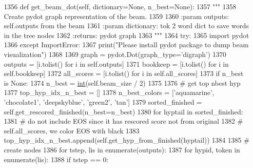 \begin{DoxyCode}
1356     \textcolor{keyword}{def }get\_beam\_dot(self, dictionary=None, n\_best=None):
1357         \textcolor{stringliteral}{"""}
1358 \textcolor{stringliteral}{        Create pydot graph representation of the beam.}
1359 \textcolor{stringliteral}{}
1360 \textcolor{stringliteral}{        :param outputs: self.outputs from the beam}
1361 \textcolor{stringliteral}{        :param dictionary: tok 2 word dict to save words in the tree nodes}
1362 \textcolor{stringliteral}{        :returns: pydot graph}
1363 \textcolor{stringliteral}{        """}
1364         \textcolor{keywordflow}{try}:
1365             \textcolor{keyword}{import} pydot
1366         \textcolor{keywordflow}{except} ImportError:
1367             print(\textcolor{stringliteral}{"Please install pydot package to dump beam visualization"})
1368 
1369         graph = pydot.Dot(graph\_type=\textcolor{stringliteral}{'digraph'})
1370         outputs = [i.tolist() \textcolor{keywordflow}{for} i \textcolor{keywordflow}{in} self.outputs]
1371         bookkeep = [i.tolist() \textcolor{keywordflow}{for} i \textcolor{keywordflow}{in} self.bookkeep]
1372         all\_scores = [i.tolist() \textcolor{keywordflow}{for} i \textcolor{keywordflow}{in} self.all\_scores]
1373         \textcolor{keywordflow}{if} n\_best \textcolor{keywordflow}{is} \textcolor{keywordtype}{None}:
1374             n\_best = \hyperlink{namespacelanguage__model_1_1eval__ppl_a7d12ee00479673c5c8d1f6d01faa272a}{int}(self.beam\_size / 2)
1375 
1376         \textcolor{comment}{# get top nbest hyp}
1377         top\_hyp\_idx\_n\_best = []
1378         n\_best\_colors = [\textcolor{stringliteral}{'aquamarine'}, \textcolor{stringliteral}{'chocolate1'}, \textcolor{stringliteral}{'deepskyblue'}, \textcolor{stringliteral}{'green2'}, \textcolor{stringliteral}{'tan'}]
1379         sorted\_finished = self.get\_rescored\_finished(n\_best=n\_best)
1380         \textcolor{keywordflow}{for} hyptail \textcolor{keywordflow}{in} sorted\_finished:
1381             \textcolor{comment}{# do not include EOS since it has rescored score not from original}
1382             \textcolor{comment}{# self.all\_scores, we color EOS with black}
1383             top\_hyp\_idx\_n\_best.append(self.get\_hyp\_from\_finished(hyptail))
1384 
1385         \textcolor{comment}{# create nodes}
1386         \textcolor{keywordflow}{for} tstep, lis \textcolor{keywordflow}{in} enumerate(outputs):
1387             \textcolor{keywordflow}{for} hypid, token \textcolor{keywordflow}{in} enumerate(lis):
1388                 \textcolor{keywordflow}{if} tstep == 0:

\end{DoxyCode}
